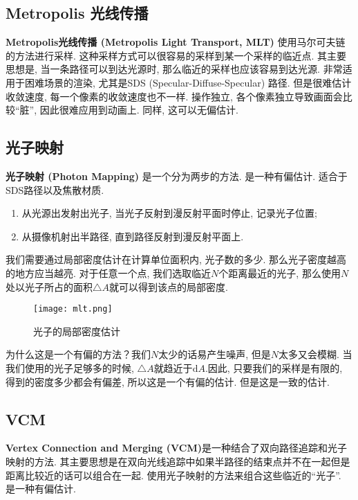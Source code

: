 \documentclass[openany]{progbookcn}
\begin{document}
\subsection{Metropolis 光线传播}

\textbf{Metropolis光线传播 (Metropolis Light Transport, MLT) }使用马尔可夫链的方法进行采样. 这种采样方式可以很容易的采样到某一个采样的临近点. 其主要思想是, 当一条路径可以到达光源时, 那么临近的采样也应该容易到达光源. 非常适用于困难场景的渲染, 尤其是SDS (Specular-Diffuse-Specular) 路径. 但是很难估计收敛速度, 每一个像素的收敛速度也不一样. 操作独立, 各个像素独立导致画面会比较``脏”, 因此很难应用到动画上. 同样, 这可以无偏估计. 

\subsection{光子映射}

\textbf{光子映射 (Photon Mapping) }是一个分为两步的方法. 是一种有偏估计. 适合于SDS路径以及焦散材质. 
\begin{enumerate}
	\item 从光源出发射出光子, 当光子反射到漫反射平面时停止, 记录光子位置; 
	\item 从摄像机射出半路径, 直到路径反射到漫反射平面上. 
\end{enumerate}

我们需要通过局部密度估计在计算单位面积内, 光子数的多少. 那么光子密度越高的地方应当越亮. 对于任意一个点, 我们选取临近$N$个距离最近的光子, 那么使用$N$处以光子所占的面积$\triangle A$就可以得到该点的局部密度. 

\begin{figure}[H]
	\centering
	\texttt{[image: mlt.png]}
	\caption{光子的局部密度估计}
	\label{fig:mlt}
\end{figure}

为什么这是一个有偏的方法？我们$N$太少的话易产生噪声, 但是$N$太多又会模糊. 当我们使用的光子足够多的时候, $\triangle A$就趋近于$\text{d}A$.因此, 只要我们的采样是有限的, 得到的密度多少都会有偏差, 所以这是一个有偏的估计. 但是这是一致的估计. 

\subsection{VCM}

\textbf{Vertex Connection and Merging (VCM)}是一种结合了双向路径追踪和光子映射的方法. 其主要思想是在双向光线追踪中如果半路径的结束点并不在一起但是距离比较近的话可以组合在一起. 使用光子映射的方法来组合这些临近的``光子”. 是一种有偏估计. 
\end{document}
